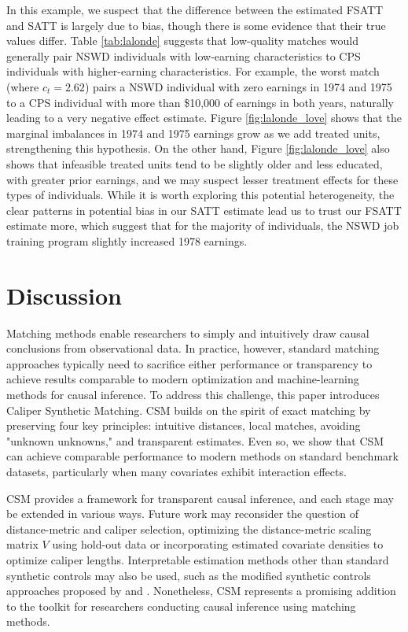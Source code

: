 \documentclass{article}
\begin{document}
In this example, we suspect that the difference between the estimated FSATT and SATT is largely due to bias, though there is some evidence that their true values differ.
Table \ref{tab:lalonde} suggests that low-quality matches would generally pair NSWD individuals with low-earning characteristics to CPS individuals with higher-earning characteristics.
For example, the worst match (where $c_t = 2.62$) pairs a NSWD individual with zero earnings in 1974 and 1975 to a CPS individual with more than \$10,000 of earnings in both years, naturally leading to a very negative effect estimate.
Figure \ref{fig:lalonde_love} shows that the marginal imbalances in 1974 and 1975 earnings grow as we add treated units, strengthening this hypothesis.
On the other hand, Figure \ref{fig:lalonde_love} also shows that infeasible treated units tend to be slightly older and less educated, with greater prior earnings, and we may suspect lesser treatment effects for these types of individuals.
While it is worth exploring this potential heterogeneity, the clear patterns in potential bias in our SATT estimate lead us to trust our FSATT estimate more, which suggest that for the majority of individuals, the NSWD job training program slightly increased 1978 earnings.


\section{Discussion}

Matching methods enable researchers to simply and intuitively draw causal conclusions from observational data.
In practice, however, standard matching approaches typically need to sacrifice either performance or transparency to achieve results comparable to modern optimization and machine-learning methods for causal inference.
To address this challenge, this paper introduces Caliper Synthetic Matching.
CSM builds on the spirit of exact matching by preserving four key principles: intuitive distances, local matches, avoiding "unknown unknowns," and transparent estimates.
Even so, we show that CSM can achieve comparable performance to modern methods on standard benchmark datasets, particularly when many covariates exhibit interaction effects.

CSM provides a framework for transparent causal inference, and each stage may be extended in various ways.
Future work may reconsider the question of distance-metric and caliper selection, optimizing the distance-metric scaling matrix $V$ using hold-out data or incorporating estimated covariate densities to optimize caliper lengths.
Interpretable estimation methods other than standard synthetic controls may also be used, such as the modified synthetic controls approaches proposed by \citet{abadie2021penalized} and \citet{ben2021augmented}.
Nonetheless, CSM represents a promising addition to the toolkit for researchers conducting causal inference using matching methods.
\end{document}
